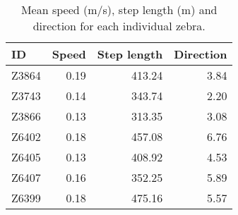 \begin{table}[H]
\centering
\caption[Movement summary of each individual, Ngamiland]{Mean speed (m/s), step length (m) and direction 
                                         for each individual zebra.} 
\label{table:summary_zebras_BWA}
\begin{tabular}{lrrr}
  \hline
ID & Speed & Step length & Direction \\ 
  \hline
Z3864 & 0.19 & 413.24 & 3.84 \\ 
  Z3743 & 0.14 & 343.74 & 2.20 \\ 
  Z3866 & 0.13 & 313.35 & 3.08 \\ 
  Z6402 & 0.18 & 457.08 & 6.76 \\ 
  Z6405 & 0.13 & 408.92 & 4.53 \\ 
  Z6407 & 0.16 & 352.25 & 5.89 \\ 
  Z6399 & 0.18 & 475.16 & 5.57 \\ 
   \hline
\end{tabular}
\end{table}
